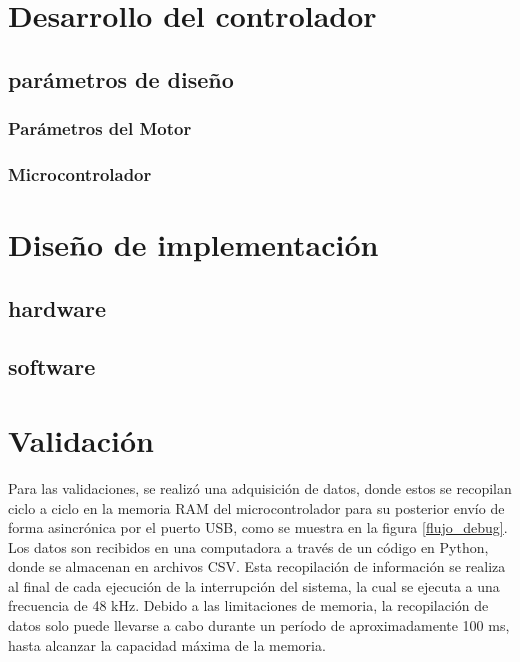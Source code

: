 \documentclass[11pt]{report}
\begin{document}

\chapter{Desarrollo del controlador}
\section{parámetros de diseño}
\subsection{Parámetros del Motor}
\subsection{Microcontrolador}



\chapter{Diseño de implementación}
\section{hardware}
\section{software}

\chapter{Validación}
Para las validaciones, se realizó una adquisición de datos, donde estos se recopilan ciclo a ciclo en la memoria RAM del microcontrolador para su posterior envío de forma asincrónica por el puerto USB, como se muestra en la figura \ref{flujo_debug}. Los datos son recibidos en una computadora a través de un código en Python, donde se almacenan en archivos CSV. Esta recopilación de información se realiza al final de cada ejecución de la interrupción del sistema, la cual se ejecuta a una frecuencia de 48 kHz. Debido a las limitaciones de memoria, la recopilación de datos solo puede llevarse a cabo durante un período de aproximadamente 100 ms, hasta alcanzar la capacidad máxima de la memoria.
\end{document}
